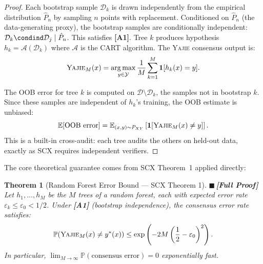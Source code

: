 \documentclass[12pt,a4paper]{article}
\newtheorem{theorem}{Theorem}[section]
\theoremstyle{definition}
\newcommand{\rigorFull}{{\color{rigorcolor}$\blacksquare$\,\textbf{[Full Proof]}}}
\newcommand{\Yajie}{\textsc{Yajie}}
\newcommand{\SCX}{\textsc{SCX}}
\DeclareMathOperator*{\argmax}{arg\,max}
\newcommand{\E}{\mathbb{E}}
\newcommand{\Pbb}{\mathbb{P}}
\newcommand{\cA}{\mathcal{A}}
\newcommand{\cD}{\mathcal{D}}
\newcommand{\cY}{\mathcal{Y}}
\newcommand{\ind}[1]{\mathbf{1}[#1]}
\newcommand{\asmTag}[1]{\textsf{\textbf{[A#1]}}}
\begin{document}
\begin{proof}
Each bootstrap sample $\cD_k$ is drawn independently from the empirical distribution $\hat{P}_n$ by sampling $n$ points with replacement. Conditioned on $\hat{P}_n$ (the data-generating proxy), the bootstrap samples are conditionally independent: $\cD_k \condind \cD_j \mid \hat{P}_n$. This satisfies \asmTag{1}. Tree $k$ produces hypothesis $h_k = \cA(\cD_k)$ where $\cA$ is the CART algorithm. The \Yajie{} consensus output is:
\begin{equation}\label{eq:rf_consensus}
    \Yajie_M(x) = \argmax_{y \in \cY} \frac{1}{M}\sum_{k=1}^{M} \ind{h_k(x) = y}.
\end{equation}

The OOB error for tree $k$ is computed on $\cD \setminus \cD_k$, the samples not in bootstrap $k$. Since these samples are independent of $h_k$'s training, the OOB estimate is unbiased:
\begin{equation}
    \E[\text{OOB error}] = \E_{(x,y) \sim P_{XY}}\left[\ind{\Yajie_M(x) \neq y}\right].
\end{equation}
This is a built-in cross-audit: each tree audits the others on held-out data, exactly as \SCX{} requires independent verifiers.
\end{proof}

The core theoretical guarantee comes from \SCX{} Theorem~1 applied directly:

\begin{theorem}[Random Forest Error Bound — SCX Theorem 1]\label{thm:rf_bound}
\rigorFull
Let $h_1, \ldots, h_M$ be the $M$ trees of a random forest, each with expected error rate $\varepsilon_k \le \varepsilon_0 < 1/2$. Under \asmTag{1} (bootstrap independence), the consensus error rate satisfies:
\begin{equation}\label{eq:rf_hoeffding}
    \Pbb(\Yajie_M(x) \neq y^*(x)) \le \exp\left(-2M\left(\frac{1}{2} - \varepsilon_0\right)^2\right).
\end{equation}
In particular, $\lim_{M \to \infty} \Pbb(\text{consensus error}) = 0$ exponentially fast.
\end{theorem}
\end{document}
